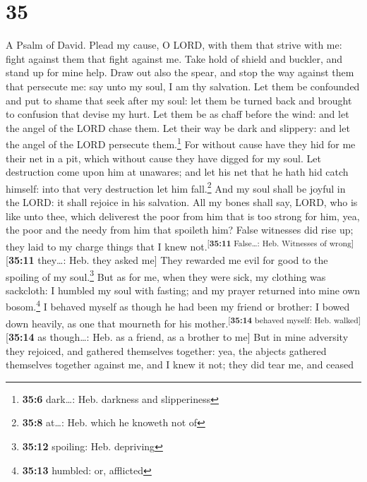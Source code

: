 \hypertarget{section-34}{%
\section{35}\label{section-34}}

A Psalm of David.  Plead my cause, O LORD, with them that
strive with me: fight against them that fight against me. 
Take hold of shield and buckler, and stand up for mine help.
 Draw out also the spear, and stop the way against them
that persecute me: say unto my soul, I am thy salvation. 
Let them be confounded and put to shame that seek after my soul: let
them be turned back and brought to confusion that devise my hurt.
 Let them be as chaff before the wind: and let the angel
of the LORD chase them.  Let their way be dark and
slippery: and let the angel of the LORD persecute them.\footnote{\textbf{35:6}
  dark\ldots: Heb. darkness and slipperiness}  For without
cause have they hid for me their net in a pit, which without cause they
have digged for my soul.  Let destruction come upon him at
unawares; and let his net that he hath hid catch himself: into that very
destruction let him fall.\footnote{\textbf{35:8} at\ldots: Heb. which he
  knoweth not of}  And my soul shall be joyful in the
LORD: it shall rejoice in his salvation.  All my bones
shall say, LORD, who is like unto thee, which deliverest the poor from
him that is too strong for him, yea, the poor and the needy from him
that spoileth him?  False witnesses did rise up; they
laid to my charge things that I knew
not.\textsuperscript{{[}\textbf{35:11} False\ldots: Heb. Witnesses of
wrong{]}}{[}\textbf{35:11} they\ldots: Heb. they asked me{]}
 They rewarded me evil for good to the spoiling of my
soul.\footnote{\textbf{35:12} spoiling: Heb. depriving} 
But as for me, when they were sick, my clothing was sackcloth: I humbled
my soul with fasting; and my prayer returned into mine own
bosom.\footnote{\textbf{35:13} humbled: or, afflicted}  I
behaved myself as though he had been my friend or brother: I bowed down
heavily, as one that mourneth for his
mother.\textsuperscript{{[}\textbf{35:14} behaved myself: Heb.
walked{]}}{[}\textbf{35:14} as though\ldots: Heb. as a friend, as a
brother to me{]}  But in mine adversity they rejoiced,
and gathered themselves together: yea, the abjects gathered themselves
together against me, and I knew it not; they did tear me, and ceased
